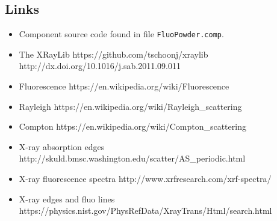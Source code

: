 \subsection*{Links}
\begin{itemize}
  \item Component source code found in file \texttt{FluoPowder.comp}.
  \item The XRayLib https://github.com/tschoonj/xraylib http://dx.doi.org/10.1016/j.sab.2011.09.011
  \item Fluorescence https://en.wikipedia.org/wiki/Fluorescence
  \item Rayleigh https://en.wikipedia.org/wiki/Rayleigh\_scattering
  \item Compton https://en.wikipedia.org/wiki/Compton\_scattering
  \item X-ray absorption edges http://skuld.bmsc.washington.edu/scatter/AS\_periodic.html
  \item X-ray fluorescence spectra http://www.xrfresearch.com/xrf-spectra/
  \item X-ray edges and fluo lines https://physics.nist.gov/PhysRefData/XrayTrans/Html/search.html
\end{itemize}
